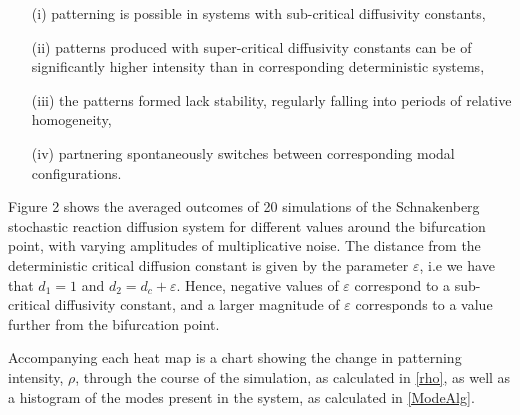 \documentclass[12pt]{article}
\begin{document}
\begin{enumerate}
    \item [(i)] patterning is possible in systems with sub-critical diffusivity constants,
    \item [(ii)] patterns produced with super-critical diffusivity constants can be of significantly higher intensity than in corresponding deterministic systems,
    \item [(iii)] the patterns formed lack stability, regularly falling into periods of relative homogeneity,
    \item[(iv)] partnering spontaneously switches between corresponding modal configurations. 
\end{enumerate}

Figure 2 shows the averaged outcomes of 20 simulations of the Schnakenberg stochastic reaction diffusion system for different values around the bifurcation point, with varying amplitudes of multiplicative noise. The distance from the deterministic critical diffusion constant is given by the parameter $\varepsilon$, i.e we have that $d_1 = 1$ and $d_2 = d_c + \varepsilon$. Hence, negative values of $\varepsilon$ correspond to a sub-critical diffusivity constant, and a larger magnitude of $\varepsilon$ corresponds to a value further from the bifurcation point.  

Accompanying each heat map is a chart showing the change in patterning intensity, $\rho$, through the course of the simulation, as calculated in \eqref{rho}, as well as a histogram of the modes present in the system, as calculated in \eqref{ModeAlg}. 
\end{document}
